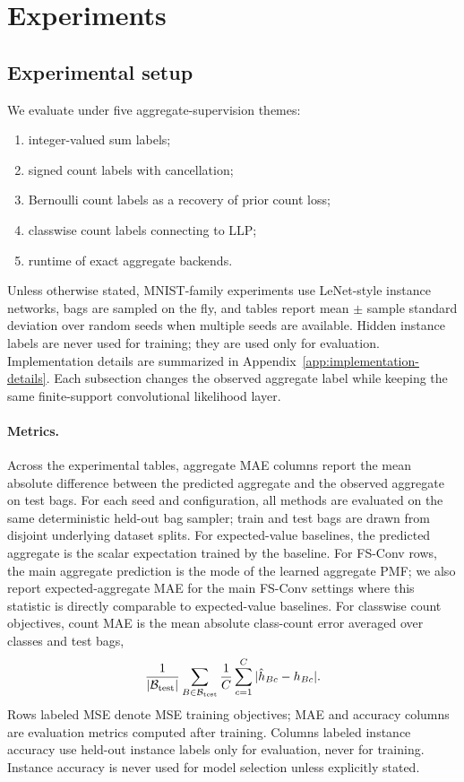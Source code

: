\section{Experiments}
\label{sec:experiments}

\subsection{Experimental setup}

We evaluate \method{} under five aggregate-supervision themes:
\begin{enumerate}
  \item integer-valued sum labels;
  \item signed count labels with cancellation;
  \item Bernoulli count labels as a recovery of prior count loss;
  \item classwise count labels connecting to LLP;
  \item runtime of exact aggregate backends.
\end{enumerate}
Unless otherwise stated, MNIST-family experiments use LeNet-style instance networks, bags are sampled on the fly, and tables report mean $\pm$ sample standard deviation over random seeds when multiple seeds are available.
Hidden instance labels are never used for training; they are used only for evaluation.
Implementation details are summarized in Appendix~\ref{app:implementation-details}.
Each subsection changes the observed aggregate label while keeping the same finite-support convolutional likelihood layer.

\paragraph{Metrics.}
Across the experimental tables, aggregate MAE columns report the mean absolute difference between the predicted aggregate and the observed aggregate on test bags.
For each seed and configuration, all methods are evaluated on the same deterministic held-out bag sampler; train and test bags are drawn from disjoint underlying dataset splits.
For expected-value baselines, the predicted aggregate is the scalar expectation trained by the baseline.
For FS-Conv rows, the main aggregate prediction is the mode of the learned aggregate PMF; we also report expected-aggregate MAE for the main FS-Conv settings where this statistic is directly comparable to expected-value baselines.
For classwise count objectives, count MAE is the mean absolute class-count error averaged over classes and test bags,
\begin{equation}
  \frac{1}{|\mathcal{B}_{\rm test}|}
  \sum_{B\in\mathcal{B}_{\rm test}}
  \frac{1}{C}\sum_{c=1}^C |\hat{h}_{Bc}-h_{Bc}|.
\end{equation}
Rows labeled MSE denote MSE training objectives; MAE and accuracy columns are evaluation metrics computed after training.
Columns labeled instance accuracy use held-out instance labels only for evaluation, never for training.
Instance accuracy is never used for model selection unless explicitly stated.

